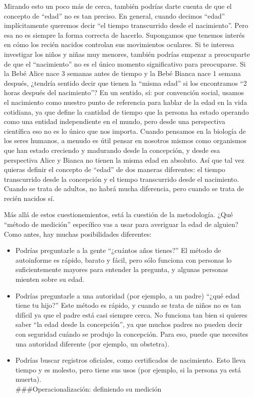 \documentclass[]{book}
\providecommand{\tightlist}{%
  \setlength{\itemsep}{0pt}\setlength{\parskip}{0pt}}
\begin{document}
Mirando esto un poco más de cerca, también podrías darte cuenta de que el concepto de ``edad'' no es tan preciso. En general, cuando decimos ``edad'' implícitamente queremos decir ``el tiempo transcurrido desde el nacimiento''. Pero esa no es siempre la forma correcta de hacerlo. Supongamos que tenemos interés en cómo los recién nacidos controlan sus movimientos oculares. Si te interesa investigar los niños y niñas muy menores, también podrías empezar a preocuparte de que el ``nacimiento'' no es el único momento significativo para preocuparse. Si la Bebé Alice nace 3 semanas antes de tiempo y la Bebé Bianca nace 1 semana después, ¿tendría sentido decir que tienen la ``misma edad'' si los encontramos ``2 horas después del nacimiento''? En un sentido, sí: por convención social, usamos el nacimiento como nuestro punto de referencia para hablar de la edad en la vida cotidiana, ya que define la cantidad de tiempo que la persona ha estado operando como una entidad independiente en el mundo, pero desde una perspectiva científica eso no es lo único que nos importa. Cuando pensamos en la biología de los seres humanos, a menudo es útil pensar en nosotros mismos como organismos que han estado creciendo y madurando desde la concepción, y desde esa perspectiva Alice y Bianca no tienen la misma edad en absoluto. Así que tal vez quieras definir el concepto de ``edad'' de dos maneras diferentes: el tiempo transcurrido desde la concepción y el tiempo transcurrido desde el nacimiento. Cuando se trata de adultos, no habrá mucha diferencia, pero cuando se trata de recién nacidos sí.

Más allá de estos cuestionemientos, está la cuestión de la metodología. ¿Qué ``método de medición'' específico vas a usar para averiguar la edad de alguien? Como antes, hay muchas posibilidades diferentes:

\begin{itemize}
\tightlist
\item
  Podrías preguntarle a la gente ``¿cuántos años tienes?'' El método de autoinforme es rápido, barato y fácil, pero sólo funciona con personas lo suficientemente mayores para entender la pregunta, y algunas personas mienten sobre su edad.
\item
  Podrías preguntarle a una autoridad (por ejemplo, a un padre) ``¿qué edad tiene tu hijo?'' Este método es rápido, y cuando se trata de niños no es tan difícil ya que el padre está casi siempre cerca. No funciona tan bien si quieres saber ``la edad desde la concepción'', ya que muchos padres no pueden decir con seguridad cuándo se produjo la concepción. Para eso, puede que necesites una autoridad diferente (por ejemplo, un obstetra).
\item
  Podrías buscar registros oficiales, como certificados de nacimiento. Esto lleva tiempo y es molesto, pero tiene sus usos (por ejemplo, si la persona ya está muerta).\\
  \#\#\#Operacionalización: definiendo su medición
\end{itemize}
\end{document}
